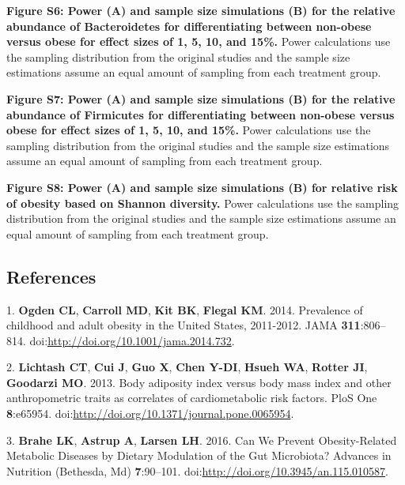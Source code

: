 \documentclass[12pt,]{article}
\begin{document}
\textbf{Figure S6: Power (A) and sample size simulations (B) for the
relative abundance of Bacteroidetes for differentiating between
non-obese versus obese for effect sizes of 1, 5, 10, and 15\%.} Power
calculations use the sampling distribution from the original studies and
the sample size estimations assume an equal amount of sampling from each
treatment group.

\textbf{Figure S7: Power (A) and sample size simulations (B) for the
relative abundance of Firmicutes for differentiating between non-obese
versus obese for effect sizes of 1, 5, 10, and 15\%.} Power calculations
use the sampling distribution from the original studies and the sample
size estimations assume an equal amount of sampling from each treatment
group.

\textbf{Figure S8: Power (A) and sample size simulations (B) for
relative risk of obesity based on Shannon diversity.} Power calculations
use the sampling distribution from the original studies and the sample
size estimations assume an equal amount of sampling from each treatment
group.

\newpage

\subsection*{References}\label{references}

1. \textbf{Ogden CL}, \textbf{Carroll MD}, \textbf{Kit BK},
\textbf{Flegal KM}. 2014. Prevalence of childhood and adult obesity in
the United States, 2011-2012. JAMA \textbf{311}:806--814.
doi:\url{http://doi.org/10.1001/jama.2014.732}.

2. \textbf{Lichtash CT}, \textbf{Cui J}, \textbf{Guo X}, \textbf{Chen
Y-DI}, \textbf{Hsueh WA}, \textbf{Rotter JI}, \textbf{Goodarzi MO}.
2013. Body adiposity index versus body mass index and other
anthropometric traits as correlates of cardiometabolic risk factors.
PloS One \textbf{8}:e65954.
doi:\url{http://doi.org/10.1371/journal.pone.0065954}.

3. \textbf{Brahe LK}, \textbf{Astrup A}, \textbf{Larsen LH}. 2016. Can
We Prevent Obesity-Related Metabolic Diseases by Dietary Modulation of
the Gut Microbiota? Advances in Nutrition (Bethesda, Md)
\textbf{7}:90--101. doi:\url{http://doi.org/10.3945/an.115.010587}.
\end{document}
